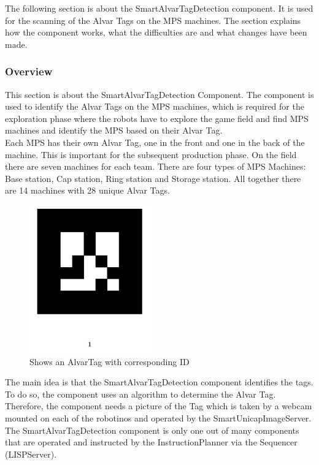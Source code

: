 The following section is about the SmartAlvarTagDetection component. It is used for the scanning of the Alvar Tags on the MPS machines. The section explains how the component works, what the difficulties are and what changes have been made. 
 
\subsubsection{Overview}


This section is about the SmartAlvarTagDetection Component. The component is used to identify the Alvar Tags on the MPS machines, which is required for the exploration phase where the robots have to explore the game field and find MPS machines and identify the MPS based on their Alvar Tag. \\
Each MPS has their own Alvar Tag, one in the front and one in the back of the machine. This is important for the subsequent production phase. On the field there are seven machines for each team. There are four types of MPS Machines: Base station, Cap station, Ring station and Storage station. All together there are 14 machines with 28 unique Alvar Tags. \\

\begin{figure}[h]
\centering
\includegraphics[scale=0.75]{pic/numberedMarker.png}
\caption{Shows an AlvarTag with corresponding ID}
\label{fig:smartAlvarFlow}
\end{figure}

The main idea is that the SmartAlvarTagDetection component identifies the tags. To do so, the component uses an algorithm to determine the Alvar Tag. Therefore, the component needs a picture of the Tag which is taken by a webcam mounted on each of the robotinos and operated by the SmartUnicapImageServer. The SmartAlvarTagDetection component is only one out of many components that are operated and instructed by the InstructionPlanner via the Sequencer (LISPServer). \\


